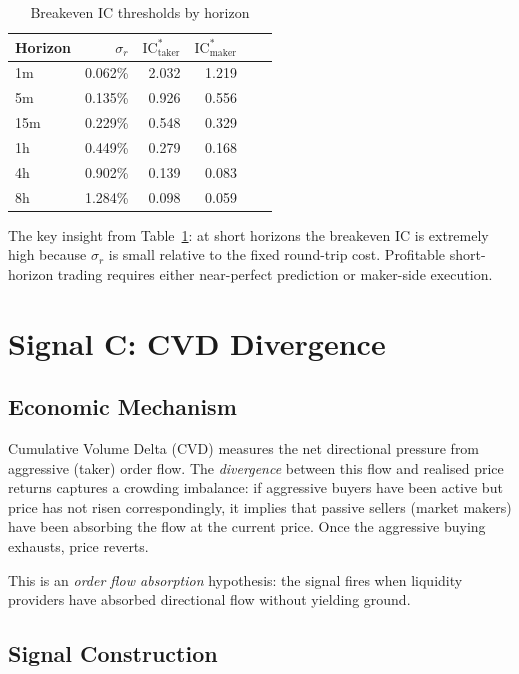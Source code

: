 \documentclass[12pt, a4paper]{article}
\theoremstyle{definition}
\newcommand{\IC}{\mathrm{IC}}
\begin{document}
\begin{table}[H]
\centering
\caption{Breakeven IC thresholds by horizon}
\label{tab:breakeven}
\begin{tabular}{lrrrrr}
\toprule
Horizon & $\sigma_r$ & $\IC^*_{\text{taker}}$ & $\IC^*_{\text{maker}}$ \\
\midrule
1m  & 0.062\% & 2.032 & 1.219 \\
5m  & 0.135\% & 0.926 & 0.556 \\
15m & 0.229\% & 0.548 & 0.329 \\
1h  & 0.449\% & 0.279 & 0.168 \\
4h  & 0.902\% & 0.139 & 0.083 \\
8h  & 1.284\% & 0.098 & 0.059 \\
\bottomrule
\end{tabular}
\end{table}

The key insight from Table~\ref{tab:breakeven}: at short horizons the
breakeven IC is extremely high because $\sigma_r$ is small relative to the
fixed round-trip cost. Profitable short-horizon trading requires either
near-perfect prediction or maker-side execution.


\section{Signal C: CVD Divergence}

\subsection{Economic Mechanism}

Cumulative Volume Delta (CVD) measures the net directional pressure from
aggressive (taker) order flow. The \emph{divergence} between this flow
and realised price returns captures a crowding imbalance: if aggressive
buyers have been active but price has not risen correspondingly, it implies
that passive sellers (market makers) have been absorbing the flow at the
current price. Once the aggressive buying exhausts, price reverts.

This is an \emph{order flow absorption} hypothesis: the signal fires when
liquidity providers have absorbed directional flow without yielding ground.

\subsection{Signal Construction}
\end{document}

